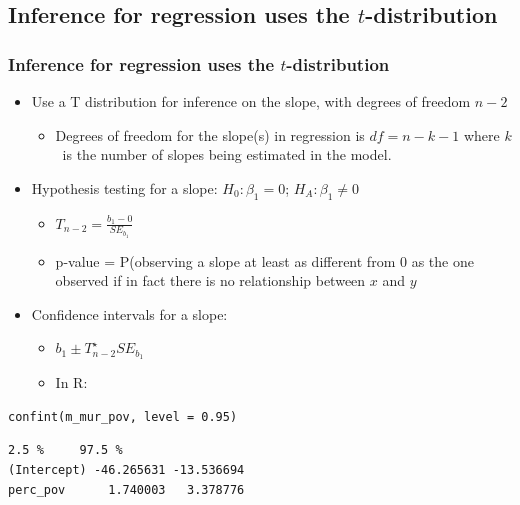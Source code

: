 \documentclass[11pt,containsverbatim,handout,xcolor=xelatex,dvipsnames,table]{beamer}
\begin{document}

\subsection{Inference for regression uses the $t$-distribution}
\label{mi4}


\begin{frame}[fragile]
\frametitle{Inference for regression uses the $t$-distribution}

\begin{itemize}

\item Use a T distribution for inference on the slope, with degrees of freedom $n - 2$
\begin{itemize}
\item Degrees of freedom for the slope(s) in regression is $df = n - k - 1$ where $k$~is the number of 
slopes being estimated in the model.
\end{itemize}

\pause

\item Hypothesis testing for a slope: $H_0: \beta_1 = 0$; $H_A: \beta_1 \ne 0$ \\
\begin{itemize}
\item $T_{n-2} = \frac{b_1 - 0}{SE_{b_1}}$
\item p-value = P(observing a slope at least as different from 0 as the one observed if in fact there is no 
relationship between $x$ and $y$
\end{itemize}

\pause

\item Confidence intervals for a slope: 
\begin{itemize}
\item $b_1 \pm T^\star_{n-2} SE_{b_1}$
\item In R:
\end{itemize}

\end{itemize}

{\scriptsize
\begin{Verbatim}[frame=single, formatcom=\color{blue}]
confint(m_mur_pov, level = 0.95)
\end{Verbatim}
}

{\scriptsize
\begin{Verbatim}[frame=single, formatcom=\color{gray}]
                 2.5 %     97.5 %
(Intercept) -46.265631 -13.536694
perc_pov      1.740003   3.378776
\end{Verbatim}
}

\end{frame}
\end{document}
